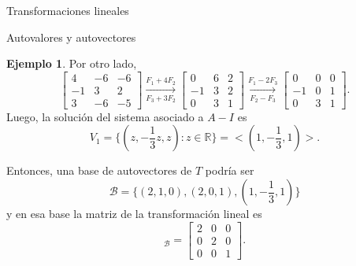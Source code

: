 \documentclass[a4paper,12pt,twoside,spanish]{amsbook}
\theoremstyle{definition}
\newtheorem{ejemplo}{Ejemplo}[section]
\theoremstyle{remark}
\newcommand{\R}{\mathbb R}
\begin{document}
\begin{chapter}{Transformaciones lineales}
\begin{section}{Autovalores y autovectores}
\begin{ejemplo}
			Por otro lado, 
			\begin{equation*}
			\begin{bmatrix}4 &-6 &-6\\ -1& 3& 2\\3 &-6& -5 	\end{bmatrix}
			\underset{F_3+3F_2}{\stackrel{F_1+4 F_2}{\longrightarrow}} 
			\begin{bmatrix}0 &6 &2\\ -1& 3& 2\\0 &3& 1 	\end{bmatrix}
			\underset{F_2-F_3}{\stackrel{F_1-2 F_3}{\longrightarrow}}
			\begin{bmatrix}0 &0 &0\\ -1& 0& 1\\0 &3& 1 	\end{bmatrix}.
			\end{equation*}
			Luego,  la solución del sistema asociado a  $A-I$ es 
			$$
			V_1 = \{(z,-\frac13z,z): z \in \R\} = <(1,-\frac13,1)>.
			$$
			
			Entonces, una base de autovectores de $T$ podría ser
			$$
			\mathcal{B} = \{(2,1,0),(2,0,1),(1,-\frac13,1) \}
			$$
			y en esa base la matriz de la transformación lineal es
			\begin{equation*}
			[T]_{\mathcal{B}} = \begin{bmatrix}2 &0 &0\\ 0& 2& 0\\0 &0& 1 	\end{bmatrix}.
			\end{equation*}
		\end{ejemplo}
	
		
		\end{section}
	
	
		
	
		
	\end{chapter}
\end{document}
